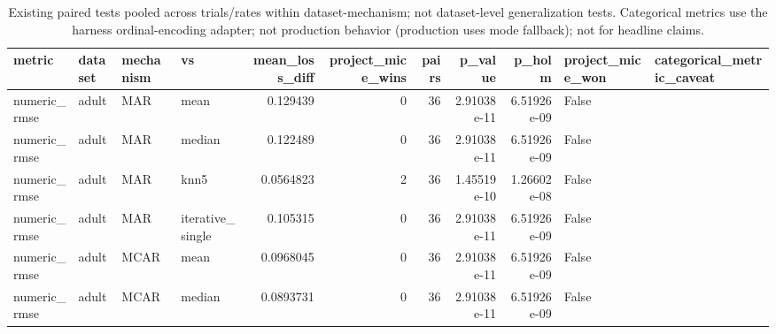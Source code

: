 \begin{table}[ht]
\centering
\caption{Existing paired tests pooled across trials/rates within dataset-mechanism; not dataset-level generalization tests. Categorical metrics use the harness ordinal-encoding adapter; not production behavior (production uses mode fallback); not for headline claims.}
\label{tab:protocol_a_pooled_significance}
\begin{tabular}{llllrrrrrll}
\hline
 metric                 & dataset              & mechanism   & vs               &   mean\_loss\_diff &   project\_mice\_wins &   pairs &     p\_value &      p\_holm & project\_mice\_won   & categorical\_metric\_caveat                                                                                          \\
\hline
 numeric\_rmse           & adult                & MAR         & mean             &      0.129439    &                   0 &      36 & 2.91038e-11 & 6.51926e-09 & False              &                                                                                                                    \\
 numeric\_rmse           & adult                & MAR         & median           &      0.122489    &                   0 &      36 & 2.91038e-11 & 6.51926e-09 & False              &                                                                                                                    \\
 numeric\_rmse           & adult                & MAR         & knn5             &      0.0564823   &                   2 &      36 & 1.45519e-10 & 1.26602e-08 & False              &                                                                                                                    \\
 numeric\_rmse           & adult                & MAR         & iterative\_single &      0.105315    &                   0 &      36 & 2.91038e-11 & 6.51926e-09 & False              &                                                                                                                    \\
 numeric\_rmse           & adult                & MCAR        & mean             &      0.0968045   &                   0 &      36 & 2.91038e-11 & 6.51926e-09 & False              &                                                                                                                    \\
 numeric\_rmse           & adult                & MCAR        & median           &      0.0893731   &                   0 &      36 & 2.91038e-11 & 6.51926e-09 & False              &                                                                                                                    \\

\end{tabular}
\end{table}
